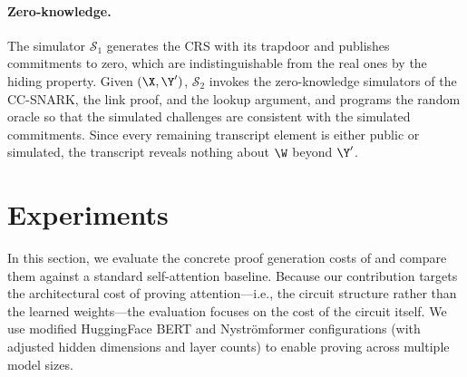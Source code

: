 \documentclass[runningheads]{llncs}
\begin{document}

\paragraph{Zero-knowledge.}
The simulator $\mathcal{S}_1$ generates the CRS with its trapdoor and publishes commitments to zero, which are indistinguishable from the real ones by the hiding property. Given $(\X, \Y')$, $\mathcal{S}_2$ invokes the zero-knowledge simulators of the CC-SNARK, the link proof, and the lookup argument, and programs the random oracle so that the simulated challenges are consistent with the simulated commitments. Since every remaining transcript element is either public or simulated, the transcript reveals nothing about $\W$ beyond $\Y'$.


\section{Experiments}
\label{sec:experiments}

In this section, we evaluate the concrete proof generation costs of \name and compare them against a standard self-attention baseline. Because our contribution targets the architectural cost of proving attention---i.e., the circuit structure rather than the learned weights---the evaluation focuses on the cost of the circuit itself. We use modified HuggingFace BERT and Nystr\"omformer configurations (with adjusted hidden dimensions and layer counts) to enable proving across multiple model sizes. 
\end{document}
